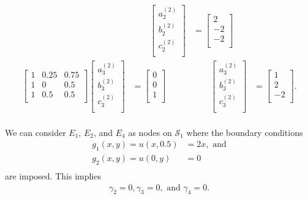 \documentclass[12pt]{article}
\newcommand{\aonetwomatrix}{
  \begin{bmatrix}
    1 & 0.25 & 0.75 \\
    1 & 0    & 0.5  \\
    1 & 0.5  & 0.5  \\
  \end{bmatrix}
}
\newcommand{\bonematrix}[2]{
  \begin{bmatrix}
    a_{#1}^{(#2)} \\
    b_{#1}^{(#2)} \\
    c_{#1}^{(#2)} \\
  \end{bmatrix}
}
\newcommand{\setupatwomatrices}[2]{
\aonetwomatrix \bonematrix{#1}{#2}
}
\begin{document}
\begin{equation}
\begin{aligned}
    &\qquad\bonematrix{2}{2} &= \begin{bmatrix}2\\-2\\-2\\\end{bmatrix}\\
    \setupatwomatrices{3}{2}&
    = \begin{bmatrix} 0\\0\\1\\\end{bmatrix}
    &\qquad\bonematrix{3}{2} &= \begin{bmatrix}1\\2\\-2\\\end{bmatrix}.\\
  \end{aligned}
\end{equation}

We can consider $E_1$, $E_2$, and $E_4$ as nodes on $\mathcal{S}_1$
where the boundary conditions
\begin{equation*}
  \begin{aligned}
    g_1(x,y) = u(x,0.5) &= 2x, \text{ and}\\
    g_2(x,y) = u(0,y) &= 0 \\
  \end{aligned}
\end{equation*}
are imposed. This implies
\begin{equation}
  \label{eq:1_gamma_2_3_4}
  \begin{aligned}
    \gamma_2 = 0, \gamma_3 = 0, \text{ and } \gamma_4 = 0.
  \end{aligned}
\end{equation}
\end{document}
